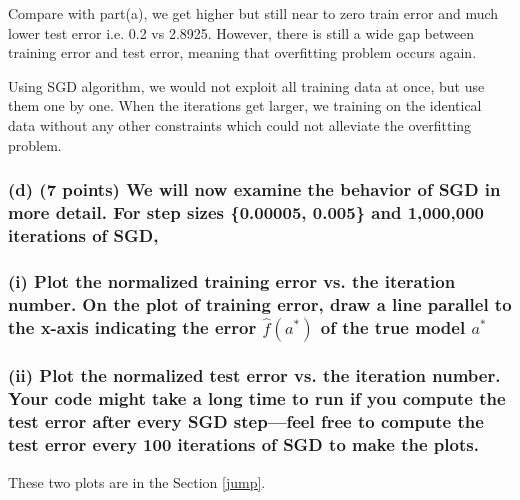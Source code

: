 \documentclass[11pt]{article}
\begin{document}
Compare with part(a), we get higher but still near to zero train error
and much lower test error i.e. 0.2 vs 2.8925. However, there is still a
wide gap between training error and test error, meaning that overfitting
problem occurs again.

Using SGD algorithm, we would not exploit all training data at once, but
use them one by one. When the iterations get larger, we training on the
identical data without any other constraints which could not alleviate
the overfitting problem.

    \subsubsection{(d) (7 points) We will now examine the behavior of SGD in
more detail. For step sizes \{0.00005, 0.005\} and 1,000,000 iterations
of
SGD,}\label{d-7-points-we-will-now-examine-the-behavior-of-sgd-in-more-detail.-for-step-sizes-0.00005-0.005-and-1000000-iterations-of-sgd}

    \subsubsection{\texorpdfstring{(i) Plot the normalized training error
vs. the iteration number. On the plot of training error, draw a line
parallel to the x-axis indicating the error \(\hat{f}(a^*)\) of the true
model
\(a^*\)}{(i) Plot the normalized training error vs. the iteration number. On the plot of training error, draw a line parallel to the x-axis indicating the error \textbackslash{}hat\{f\}(a\^{}*) of the true model a\^{}*}}\label{i-plot-the-normalized-training-error-vs.-the-iteration-number.-on-the-plot-of-training-error-draw-a-line-parallel-to-the-x-axis-indicating-the-error-hatfa-of-the-true-model-a}

\subsubsection{(ii) Plot the normalized test error vs. the iteration
number. Your code might take a long time to run if you compute the test
error after every SGD step---feel free to compute the test error every
100 iterations of SGD to make the
plots.}\label{ii-plot-the-normalized-test-error-vs.-the-iteration-number.-your-code-might-take-a-long-time-to-run-if-you-compute-the-test-error-after-every-sgd-stepfeel-free-to-compute-the-test-error-every-100-iterations-of-sgd-to-make-the-plots.}

     These two plots are in the Section \ref{jump}.
\end{document}
